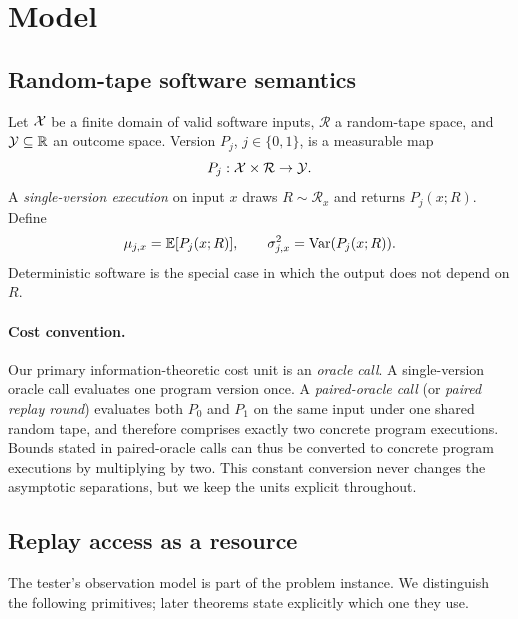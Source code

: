 \section{Model}
\label{sec:model}

\subsection{Random-tape software semantics}
Let $\mathcal{X}$ be a finite domain of valid software inputs, $\mathcal{R}$ a random-tape
space, and $\mathcal{Y}\subseteq\mathbb{R}$ an outcome space.  Version $P_j$,
$j\in\{0,1\}$, is a measurable map
\[
P_j:\mathcal{X}\times\mathcal{R}\to\mathcal{Y}.
\]
A \emph{single-version execution} on input $x$ draws
$R\sim\mathcal{R}_x$ and returns $P_j(x;R)$.  Define
\[
\mu_{j,x}=\mathbb{E}[P_j(x;R)],
\qquad
\sigma_{j,x}^2=\mathrm{Var}(P_j(x;R)).
\]
Deterministic software is the special case in which the output does not depend on
$R$.

\paragraph{Cost convention.}
Our primary information-theoretic cost unit is an \emph{oracle call}.  A
single-version oracle call evaluates one program version once.  A
\emph{paired-oracle call} (or \emph{paired replay round}) evaluates both $P_0$
and $P_1$ on the same input under one shared random tape, and therefore comprises
exactly two concrete program executions.  Bounds stated in paired-oracle calls can
thus be converted to concrete program executions by multiplying by two.  This
constant conversion never changes the asymptotic separations, but we keep the
units explicit throughout.

\subsection{Replay access as a resource}
\label{sec:replay-access}

The tester's observation model is part of the problem instance.  We distinguish
the following primitives; later theorems state explicitly which one they use.


